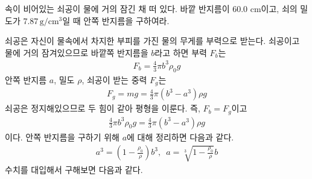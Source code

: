 \documentclass[floatfix,nofootinbib,superscriptaddress,fleqn]{revtex4-2}
\begin{document}
속이 비어있는 쇠공이 물에 거의 잠긴
채 떠 있다. 바깥 반지름이 60.0 cm이고, 쇠의 밀도가
$7.87\,\mathrm{g/cm^3}$일 때 안쪽 반지름을 구하여라.

쇠공은 자신이 물속에서 차지한 부피를 가진 물의 무게를 부력으로 받는다.
쇠공이고 물에 거의 잠겨있으므로 바깥쪽 반지름을 $b$라고 하면 
부력 $F_b$는
\begin{align}
  F_b = \frac{4}{3}\pi b^3\rho_0 g
\end{align}
안쪽 반지름 $a$,  밀도 $\rho$, 쇠공이 받는 중력 $F_g$는
\begin{align}
  F_g = mg = \frac{4}{3}\pi(b^3-a^3)\rho g
\end{align}
쇠공은 정지해있으므로 두 힘이 같아 평형을 이룬다. 즉, $F_b = F_g$이고
\begin{align}
  \frac{4}{3}\pi b^3\rho_0 g = \frac{4}{3}\pi(b^3-a^3)\rho g
\end{align}
이다. 안쪽 반지름을 구하기 위해 $a$에 대해 정리하면 다음과 같다.
\begin{align}
  a^3 = \left(1-\frac{\rho_0}{\rho}\right)b^3,\,\,\,
  a = \sqrt[3]{1-\frac{\rho_0}{\rho}}b
\end{align}
수치를 대입해서 구해보면 다음과 같다.
\end{document}
